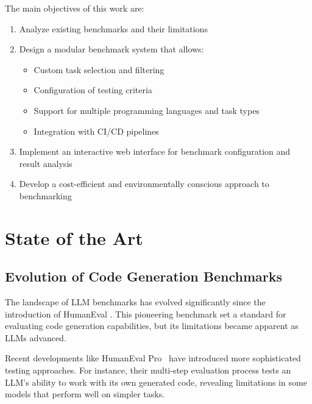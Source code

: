 The main objectives of this work are:
\begin{enumerate}
    \item Analyze existing benchmarks and their limitations
    \item Design a modular benchmark system that allows:
    \begin{itemize}
        \item Custom task selection and filtering
        \item Configuration of testing criteria
        \item Support for multiple programming languages and task types
        \item Integration with CI/CD pipelines
    \end{itemize}
    \item Implement an interactive web interface for benchmark configuration and result analysis
    \item Develop a cost-efficient and environmentally conscious approach to benchmarking
\end{enumerate}

\chapter{State of the Art}

\section{Evolution of Code Generation Benchmarks}

The landscape of LLM benchmarks has evolved significantly since the introduction of HumanEval \cite{chen2021evaluatinglargelanguagemodels}. This pioneering benchmark set a standard for evaluating code generation capabilities, but its limitations became apparent as LLMs advanced.

Recent developments like HumanEval Pro~\cite{yu2024humanevalprombpppro} have introduced more sophisticated testing approaches. For instance, their multi-step evaluation process tests an LLM's ability to work with its own generated code, revealing limitations in some models that perform well on simpler tasks.


